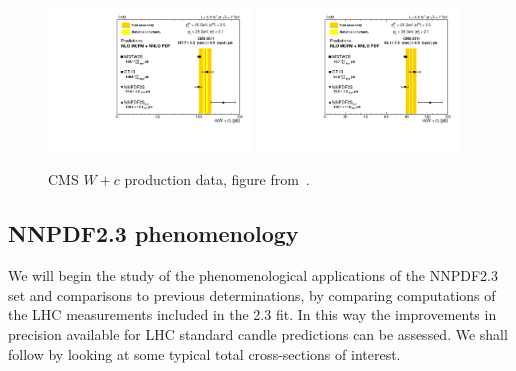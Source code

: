 \begin{figure}[h!]
\centering
\includegraphics[width=0.48\textwidth]{6-LHCimpact/figs/LEP_Style_Sc_25_V13.pdf}
\includegraphics[width=0.48\textwidth]{6-LHCimpact/figs/LEP_Style_Sc_35_V13.pdf}
\caption[CMS $W+c$ production data]{CMS $W+c$ production data, figure from~\cite{Chatrchyan:2013uja}.}
\label{fig:WplusC}
\end{figure}

\subsection{NNPDF2.3 phenomenology}

We will begin the study of the phenomenological applications of the NNPDF2.3 set and comparisons to previous determinations, by comparing computations of the LHC measurements included in the 2.3 fit. In this way the improvements in precision available for LHC standard candle predictions can be assessed. We shall follow by looking at some
typical total cross-sections of interest.

